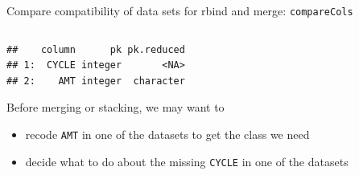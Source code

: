 \documentclass[
  8pt,
  ignorenonframetext,
  aspectratio=169]{beamer}
\providecommand{\tightlist}{%
  \setlength{\itemsep}{0pt}\setlength{\parskip}{0pt}}
\begin{document}
\begin{frame}[fragile]{Compare compatibility of data sets for rbind and
merge: \texttt{compareCols}}
\begin{columns}[T]
\begin{column}{0.48\textwidth}
\begin{verbatim}
##    column      pk pk.reduced
## 1:  CYCLE integer       <NA>
## 2:    AMT integer  character
\end{verbatim}

\vspace{12pt}

Before merging or stacking, we may want to

\begin{itemize}
\tightlist
\item
  recode \texttt{AMT} in one of the datasets to get the class we need
\item
  decide what to do about the missing \texttt{CYCLE} in one of the
  datasets
\end{itemize}
\end{column}
\end{columns}
\end{frame}
\end{document}
